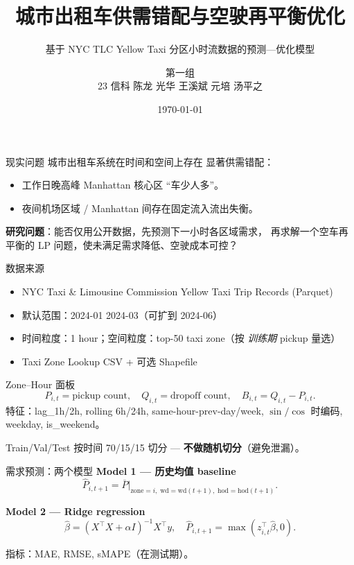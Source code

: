 \documentclass[aspectratio=169,11pt]{beamer}
\title[NYC TLC Taxi Rebalancing]{城市出租车供需错配与空驶再平衡优化}
\subtitle{基于 NYC TLC Yellow Taxi 分区小时流数据的预测—优化模型}
\author{第一组 \\ \small 23 信科 陈龙 \quad 22 光华 王溪斌 \quad 23 元培 汤平之}
\institute{数值分析期末项目（2026 春）}
\date{\today}
\begin{document}
\begin{frame}
\titlepage
\end{frame}

\begin{frame}{现实问题}
城市出租车系统在时间和空间上存在 \alert{显著供需错配}：
\begin{itemize}
\item 工作日晚高峰 Manhattan 核心区 “车少人多”。
\item 夜间机场区域 / Manhattan 间存在固定流入流出失衡。
\end{itemize}
\vspace{0.5em}
\textbf{研究问题}：能否仅用公开数据，先预测下一小时各区域需求，
再求解一个空车再平衡的 LP 问题，使未满足需求降低、空驶成本可控？
\end{frame}

\begin{frame}{数据来源}
\begin{itemize}
\item NYC Taxi \& Limousine Commission Yellow Taxi Trip Records (Parquet)
\item 默认范围：2024-01 \textendash{} 2024-03（可扩到 2024-06）
\item 时间粒度：1 hour；空间粒度：top-50 taxi zone（按 \emph{训练期} pickup 量选）
\item Taxi Zone Lookup CSV + 可选 Shapefile
\end{itemize}
\end{frame}

\begin{frame}{Zone--Hour 面板}
\[
P_{i,t}=\text{pickup count},\quad
Q_{i,t}=\text{dropoff count},\quad
B_{i,t}=Q_{i,t}-P_{i,t}.
\]
特征：lag\_1h/2h, rolling 6h/24h, same-hour-prev-day/week, $\sin/\cos$ 时编码, weekday, is\_weekend。

\vspace{0.5em}
Train/Val/Test 按时间 70/15/15 切分 — \textbf{不做随机切分}（避免泄漏）。
\end{frame}

\begin{frame}{需求预测：两个模型}
\textbf{Model 1 — 历史均值 baseline}
\[
\widehat P_{i,t+1}=\overline{P}\big|_{\text{zone}=i,\;\text{wd}=\text{wd}(t+1),\;\text{hod}=\text{hod}(t+1)}.
\]

\textbf{Model 2 — Ridge regression}
\[
\widehat\beta=(X^\top X+\alpha I)^{-1}X^\top y,\quad
\widehat P_{i,t+1}=\max(z_{i,t}^\top\widehat\beta,0).
\]

指标：MAE, RMSE, sMAPE（在测试期）。
\end{frame}
\end{document}
